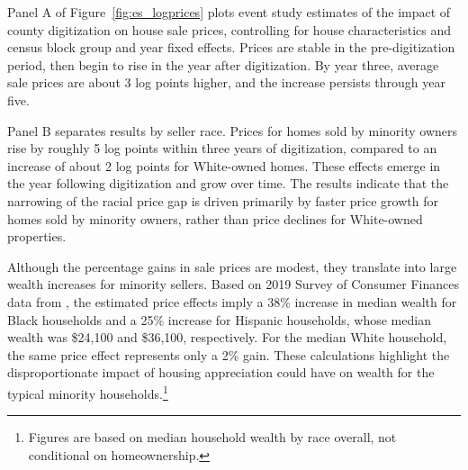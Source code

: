 \documentclass[11pt]{article}
\begin{document}
Panel A of Figure~\ref{fig:es_logprices} plots event study estimates of the impact of county digitization on house sale prices, controlling for house characteristics and census block group and year fixed effects. Prices are stable in the pre-digitization period, then begin to rise in the year after digitization. By year three, average sale prices are about 3 log points higher, and the increase persists through year five.

Panel B separates results by seller race. Prices for homes sold by minority owners rise by roughly 5 log points within three years of digitization, compared to an increase of about 2 log points for White-owned homes. These effects emerge in the year following digitization and grow over time. The results indicate that the narrowing of the racial price gap is driven primarily by faster price growth for homes sold by minority owners, rather than price declines for White-owned properties.

Although the percentage gains in sale prices are modest, they translate into large wealth increases for minority sellers. Based on 2019 Survey of Consumer Finances data from \citet{bhuttaDisparitiesWealthRace2020}, the estimated price effects imply a 38\% increase in median wealth for Black households and a 25\% increase for Hispanic households, whose median wealth was \$24,100 and \$36,100, respectively. For the median White household, the same price effect represents only a 2\% gain. These calculations highlight the disproportionate impact of housing appreciation could have on wealth for the typical minority households.\footnote{Figures are based on median household wealth by race overall, not conditional on homeownership.}

\end{document}
